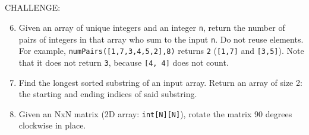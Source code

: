 \documentclass{article}
\begin{document}
\subsection*{}

CHALLENGE:

\begin{enumerate}\setcounter{enumi}{5}
    
    \item Given an array of unique integers and an integer \texttt{n}, return the number of pairs of integers in that array who sum to the input \texttt{n}. Do not reuse elements. For example, \texttt{numPairs([1,7,3,4,5,2],8)} returns \texttt{2} (\texttt{[1,7]} and \texttt{[3,5]}). Note that it does not return \texttt{3}, because \texttt{[4, 4]} does not count.

    \item Find the longest sorted substring of an input array. Return an array of size 2: the starting and ending indices of said substring.
    
    
    \item Given an NxN matrix (2D array: \texttt{int[N][N]}), rotate the matrix 90 degrees clockwise in place.
    
    
\end{enumerate}

\clearpage
\end{document}
